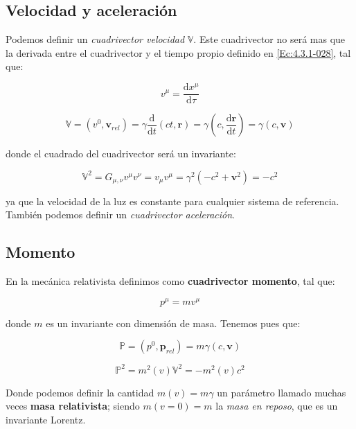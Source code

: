 \documentclass[12pt,a4paper]{book}
\newcommand{\D}{\mathrm{d}}
\begin{document}
\subsection{Velocidad y aceleración}

Podemos definir un \textit{cuadrivector velocidad} $\mathbb{V}$. Este cuadrivector no será mas que la derivada entre el cuadrivector y el tiempo propio definido en \ref{Ec:4.3.1-028}, tal que:

\begin{equation}
v^{\mu} = \dfrac{\D x^{\mu}}{\D\tau}
\end{equation}


\begin{equation}
\mathbb{V} = (v^0, \mathbf{v}_{rel}) = \gamma \dfrac{\D}{\D t} (ct,\mathbf{r}) = \gamma \left( c, \dfrac{\D \mathbf{r}}{\D t} \right) = \gamma (c, \mathbf{v})
\end{equation}

donde el cuadrado del cuadrivector será un invariante:

\begin{equation}
\mathbb{V}^2 = G_{\mu,\nu} v^{\mu} v^{\nu} = v_\mu v^\mu = \gamma^2(-c^2 + \mathbf{v}^2) = - c^2
\end{equation}

ya que la velocidad de la luz es constante para cualquier sistema de referencia. También podemos definir un \textit{cuadrivector aceleración}.

\subsection{Momento}

En la mecánica relativista definimos como \textbf{cuadrivector momento}, tal que:

\begin{equation}
p^{\mu} = m v^{\mu}
\end{equation}

donde $m$ es un invariante con dimensión de masa. Tenemos pues que:

\begin{equation}
\mathbb{P} = (p^0, \mathbf{p}_{rel}) = m \gamma (c, \mathbf{v})
\end{equation}

\begin{equation}
\mathbb{P}^2 = m^2 (v) \mathbb{V}^2 =  - m^2 (v) c^2
\end{equation}

Donde podemos definir la cantidad $m(v) = m \gamma$ un parámetro llamado muchas veces \textbf{masa relativista}; siendo $m(v=0) = m$ la \textit{masa en reposo}, que es un invariante Lorentz. \\ 
\end{document}
